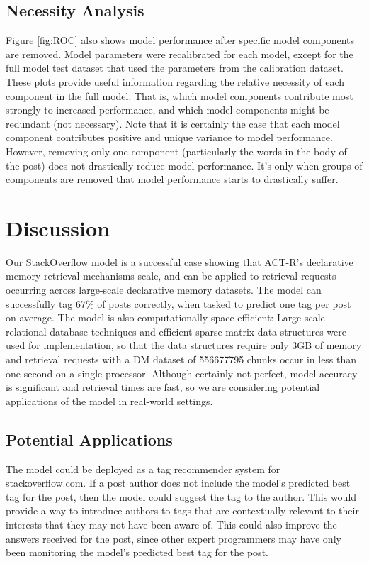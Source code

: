 \documentclass[10pt,letterpaper]{article}
\begin{document}
\subsection{Necessity Analysis}

Figure \ref{fig:ROC} also shows model performance after specific model components are removed.
Model parameters were recalibrated for each model, except for the full model test dataset that used the parameters from the calibration dataset.
These plots provide useful information regarding the relative necessity of each component in the full model.
That is, which model components contribute most strongly to increased performance, and which model components might be redundant (not necessary).
Note that it is certainly the case that each model component contributes positive and unique variance to model performance.
However, removing only one component (particularly the words in the body of the post) does not drastically reduce model performance.
It's only when groups of components are removed that model performance starts to drastically suffer.

\section{Discussion}

Our StackOverflow model is a successful case showing that ACT-R's declarative memory retrieval mechanisms scale, and can be applied to retrieval requests occurring across large-scale declarative memory datasets. 
The model can successfully tag 67\% of posts correctly, when tasked to predict one tag per post on average.
The model is also computationally space efficient:
Large-scale relational database techniques and efficient sparse matrix data structures were used for implementation,
so that the data structures require only 3GB of memory and retrieval requests with a DM dataset of \num{556677795} chunks occur in less than one second on a single processor.
Although certainly not perfect, model accuracy is significant and retrieval times are fast, so we are considering potential applications of the model in real-world settings.

\subsection{Potential Applications}

The model could be deployed as a tag recommender system for stackoverflow.com. 
If a post author does not include the model's predicted best tag for the post, then the model could suggest the tag to the author.
This would provide a way to introduce authors to tags that are contextually relevant to their interests that they may not have been aware of.
This could also improve the answers received for the post, since other expert programmers may have only been monitoring the model's predicted best tag for the post.
\end{document}
